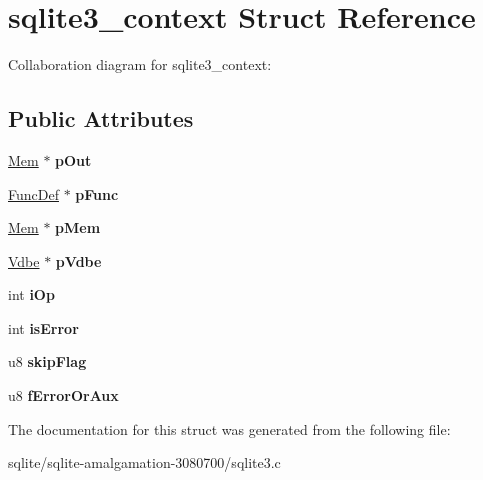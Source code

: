 \hypertarget{structsqlite3__context}{\section{sqlite3\+\_\+context Struct Reference}
\label{structsqlite3__context}
}


Collaboration diagram for sqlite3\+\_\+context\+:
\subsection*{Public Attributes}
\begin{DoxyCompactItemize}
\item 
\hypertarget{structsqlite3__context_ae22b1db2ea357b70dda4a86b6df01f34}{\hyperlink{struct_mem}{Mem} $\ast$ {\bfseries p\+Out}}\label{structsqlite3__context_ae22b1db2ea357b70dda4a86b6df01f34}

\item 
\hypertarget{structsqlite3__context_af4215c87be2c0cb10868f623a552a2aa}{\hyperlink{struct_func_def}{Func\+Def} $\ast$ {\bfseries p\+Func}}\label{structsqlite3__context_af4215c87be2c0cb10868f623a552a2aa}

\item 
\hypertarget{structsqlite3__context_a7b84aa5920329cb0eb943832175b48b5}{\hyperlink{struct_mem}{Mem} $\ast$ {\bfseries p\+Mem}}\label{structsqlite3__context_a7b84aa5920329cb0eb943832175b48b5}

\item 
\hypertarget{structsqlite3__context_ab35b02abe9a81e0c8cbdaeb0aa1a5874}{\hyperlink{struct_vdbe}{Vdbe} $\ast$ {\bfseries p\+Vdbe}}\label{structsqlite3__context_ab35b02abe9a81e0c8cbdaeb0aa1a5874}

\item 
\hypertarget{structsqlite3__context_a6f5930106488b9ead6f8efefe9125b6c}{int {\bfseries i\+Op}}\label{structsqlite3__context_a6f5930106488b9ead6f8efefe9125b6c}

\item 
\hypertarget{structsqlite3__context_ae4351b8da8c6d2676074612c1b8d4af5}{int {\bfseries is\+Error}}\label{structsqlite3__context_ae4351b8da8c6d2676074612c1b8d4af5}

\item 
\hypertarget{structsqlite3__context_a29c404b8744ed5967960c576f3e59bd3}{u8 {\bfseries skip\+Flag}}\label{structsqlite3__context_a29c404b8744ed5967960c576f3e59bd3}

\item 
\hypertarget{structsqlite3__context_a342986cd1a7c165151c53af83fe24b1d}{u8 {\bfseries f\+Error\+Or\+Aux}}\label{structsqlite3__context_a342986cd1a7c165151c53af83fe24b1d}

\end{DoxyCompactItemize}


The documentation for this struct was generated from the following file\+:\begin{DoxyCompactItemize}
\item 
sqlite/sqlite-\/amalgamation-\/3080700/sqlite3.\+c\end{DoxyCompactItemize}
